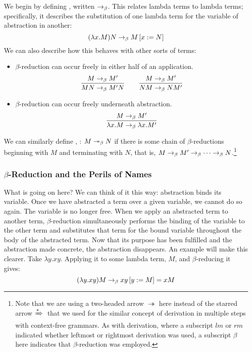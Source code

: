 We begin by defining , written $\betared$. This relates lambda terms to lambda terms; specifically, it describes the substitution of one lambda term for the variable of abstraction in another:
\[
(\lambda x . M) N \betared \replace{x}{N}{M}
\]
We can also describe how this behaves with other sorts of terms:
\begin{itemize}
\item $\beta$-reduction can occur freely in either half of an application.
\[
\frac{M \betared M\prime}{MN \betared M\prime N}
\qquad
\frac{M \betared M\prime}{NM \betared NM\prime}
\]
\item $\beta$-reduction can occur freely underneath abstraction.
\[
\frac{M \betared M\prime}{\lambda x.M \betared \lambda x.M\prime}
\]
\end{itemize}
We can similarly define , \betared[*]: $M \betared[*] N$ if there is some chain of $\beta$-reductions beginning with $M$ and terminating with $N$, that is, $M \betared M\prime \betared \dotsb \betared N$.\footnote{Note that we are using a two-headed arrow $\twoheadrightarrow$ here instead of the starred arrow $\derives[*]{}$ that we used for the similar concept of derivation in multiple steps with context-free grammars. As with derivation, where a subscript $lm$ or $rm$ indicated whether leftmost or rightmost derivation was used, a subscript $\beta$ here indicates that $\beta$-reduction was employed.}

\subsubsection{\texorpdfstring{$\beta$-Reduction and the Perils of Names}{Beta-Reduction and the Perils of Names}}\label{untyped:nameperils}
What is going on here? We can think of it this way: abstraction binds its variable. Once we have abstracted a term over a given variable, we cannot do so again. The variable is no longer free. When we apply an abstracted term to another term, $\beta$-reduction simultaneously performs the binding of the variable to the other term and substitutes that term for the bound variable throughout the body of the abstracted term. Now that its purpose has been fulfilled and the abstraction made concrete, the abstraction disappears. An example will make this clearer. Take $\lambda y . xy$. Applying it to some lambda term, $M$, and $\beta$-reducing it gives:
\[
(\lambda y . xy) M \betared \replace{y}{M}{xy} = xM
\]

